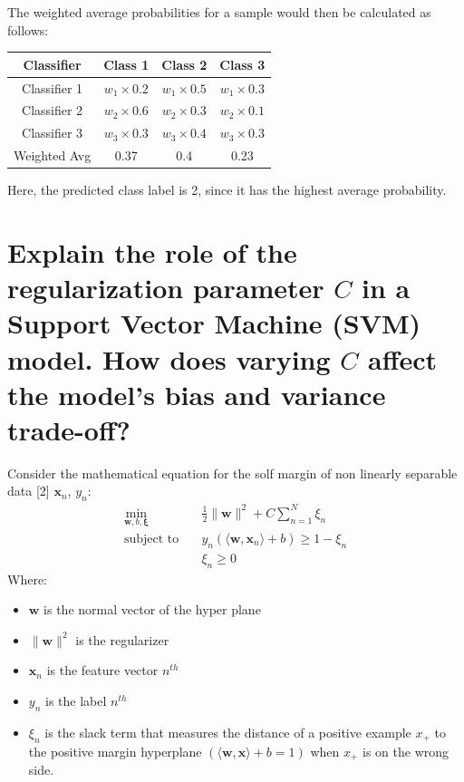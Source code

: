 \documentclass[11pt]{article}
\providecommand{\tightlist}{%
      \setlength{\itemsep}{0pt}\setlength{\parskip}{0pt}}
\begin{document}
\begin{enumerate}
  The weighted average probabilities for a sample would then be
  calculated as follows:

\begin{tabular}{|c|c|c|c|}
\hline
Classifier & Class 1 & Class 2 & Class 3 \\
\hline
Classifier 1 & $w_1 \times 0.2$ & $w_1 \times 0.5$ & $w_1 \times 0.3$ \\
Classifier 2 & $w_2 \times 0.6$ & $w_2 \times 0.3$ & $w_2 \times 0.1$ \\
Classifier 3 & $w_3 \times 0.3$ & $w_3 \times 0.4$ & $w_3 \times 0.3$ \\
\hline
Weighted Avg & 0.37 & 0.4 & 0.23 \\
\hline
\end{tabular}


Here, the predicted class label is 2, since it has the highest average probability.
\end{enumerate}


\pagebreak
    \hypertarget{explain-the-role-of-the-regularization-parameter-c-in-a-support-vector-machine-svm-model.-how-does-varying-c-affect-the-models-bias-and-variance-trade-off}{%
\section{\texorpdfstring{Explain the role of the regularization
parameter \(C\) in a Support Vector Machine (SVM) model. How does
varying \(C\) affect the model's bias and variance
trade-off?}{Explain the role of the regularization parameter C in a Support Vector Machine (SVM) model. How does varying C affect the model's bias and variance trade-off?}}\label{explain-the-role-of-the-regularization-parameter-c-in-a-support-vector-machine-svm-model.-how-does-varying-c-affect-the-models-bias-and-variance-trade-off}}

    Consider the mathematical equation for the solf margin of non linearly
separable data {[}2{]} \(\mathbf{x}_n\), \(y_n\):
\begin{align*}
\min_{\boldsymbol{w},b,\boldsymbol{\xi}} \quad & \frac{1}{2}\|{\boldsymbol{w}}\|^2 + C\sum_{n=1}^{N}\xi_{n} \\
\text{subject to} \quad & y_{n}(\langle{\boldsymbol{w}},{\boldsymbol{x}}_{n}\rangle+b) \geqslant 1 - \xi_{n} \\
& \xi_{n} \geqslant 0
\end{align*}
    Where: 
    \begin{itemize}
  	\tightlist
  	\item
    	\(\boldsymbol{w}\) is the normal vector of the hyper plane
    \item
    	\(\lVert{\boldsymbol{w}}\rVert^2\) is the regularizer
  	\item
    	\(\boldsymbol{x}_n\) is the feature vector \(n^{th}\) 
  	\item
    	\(y_n\) is the label \(n^{th}\) 
   	\item
   		\(\xi_n\) is the slack term that measures the distance of a positive 		example \(x_{+}\) to the positive margin hyperplane \((\langle{\mathbf{w}, \mathbf{x}}\rangle + b = 1)\) when \(x_{+}\) is on the wrong side.
  	\end{itemize}
\end{document}

